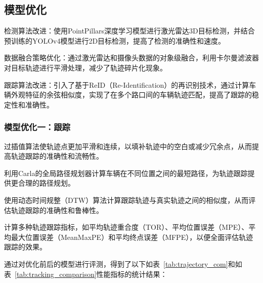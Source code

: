 \subsection{模型优化}

检测算法改进：使用PointPillars深度学习模型进行激光雷达3D目标检测，并结合预训练的YOLOv4模型进行2D目标检测，提高了检测的准确性和速度。

数据融合策略优化：通过激光雷达和摄像头数据的对象级融合，利用卡尔曼滤波器对目标轨迹进行平滑处理，减少了轨迹碎片化现象。

跟踪算法改进：引入了基于ReID（Re-Identification）的再识别技术，通过计算车辆外观特征的余弦相似度，实现了在多个路口间的车辆轨迹匹配，提高了跟踪的稳定性和准确性。

\subsubsection{模型优化一：跟踪}

过插值算法使轨迹点更加平滑和连续，以填补轨迹中的空白或减少冗余点，从而提高轨迹跟踪的准确性和流畅性。

利用Carla的全局路径规划器计算车辆在不同位置之间的最短路径，为轨迹跟踪提供更合理的路径规划。

使用动态时间规整（DTW）算法计算跟踪轨迹与真实轨迹之间的相似度，从而评估轨迹跟踪的准确性和鲁棒性。

计算多种轨迹跟踪指标，如平均轨迹重合度（TOR）、平均位置误差（MPE）、平均最大位置误差（MeanMaxPE）和平均终点误差（MFPE），以便全面评估轨迹跟踪的效果。

通过对优化前后的模型进行评测，得到了以下如表~\ref{tab:trajectory_com}和如表~\ref{tab:tracking_comparison}性能指标的统计结果：

